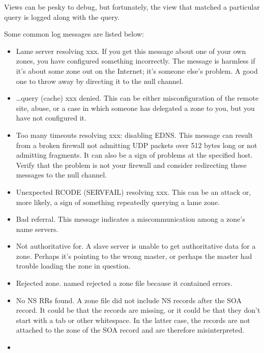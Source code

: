 Views can be pesky to debug, but fortunately, the view that matched a
particular query is logged along with the query.

Some common log messages are listed below:

\begin{itemize}
\tightlist
\item
  \protect\hypertarget{part0024_split_070.htmlux5cux23_idIndexMarker2288}{}{}\protect\hypertarget{part0024_split_070.htmlux5cux23_idIndexMarker2289}{}{}{Lame
  server resolving xxx.} If you get this message about one of your own
  zones, you have configured something incorrectly. The message is
  harmless if it's about some zone out on the Internet; it's someone
  else's problem. A good one to throw away by directing it to the {null}
  channel.
\item
  { \ldots query (cache) xxx denied}. This can be either
  misconfiguration of the remote site, abuse, or a case in which someone
  has delegated a zone to you, but you have not configured it.
\item
  {Too many timeouts resolving xxx: disabling EDNS}. This message can
  result from a broken firewall not admitting UDP packets over 512 bytes
  long or not admitting fragments. It can also be a sign of problems at
  the specified host. Verify that the problem is not your firewall and
  consider redirecting these messages to the null channel.
\item
  {Unexpected RCODE
  (}{\protect\hypertarget{part0024_split_070.htmlux5cux23_idIndexMarker2290}{}{}}{SERVFAIL)
  resolving xxx}. This can be an attack or, more likely, a sign of
  something repeatedly querying a lame zone.
\item
  {Bad referral}. This message indicates a miscommunication among a
  zone's name servers.
\item
  {Not authoritative for}. A slave server is unable to get authoritative
  data for a zone. Perhaps it's pointing to the wrong master, or perhaps
  the master had trouble loading the zone in question.
\item
  {Rejected zone}. {named} rejected a zone file because it contained
  errors.
\item
  {No NS RRs found}. A zone file did not include NS records after the
  SOA record. It could be that the records are missing, or it could be
  that they don't start with a tab or other whitespace. In the latter
  case, the records are not attached to the zone of the SOA record and
  are therefore misinterpreted.
\item

\end{itemize}
